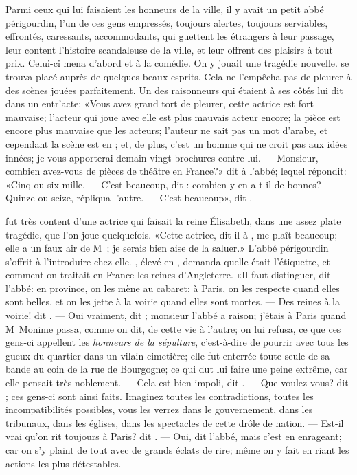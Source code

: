 Parmi ceux qui lui faisaient les honneurs de la ville, il y avait un
petit abbé périgourdin, l’un de ces gens empressés, toujours alertes,
toujours serviables, effrontés, caressants, accommodants, qui guettent
les étrangers à leur passage, leur content l’histoire scandaleuse de la
ville, et leur offrent des plaisirs à tout prix. Celui-ci mena d’abord
 et  à la comédie. On y jouait une tragédie nouvelle.
 se trouva placé auprès de quelques beaux esprits. Cela ne
l’empêcha pas de pleurer à des scènes jouées parfaitement. Un des
raisonneurs qui étaient à ses côtés lui dit dans un entr’acte: «Vous
avez grand tort de pleurer, cette actrice est fort mauvaise; l’acteur
qui joue avec elle est plus mauvais acteur encore; la pièce est encore
plus mauvaise que les acteurs; l’auteur ne sait pas un mot d’arabe, et
cependant la scène est en ; et, de plus, c’est un homme qui ne
croit pas aux idées innées; je vous apporterai demain vingt 
brochures 
contre lui. — Monsieur, combien avez-vous de pièces de théâtre en
France?» dit  à l’abbé; lequel répondit: «Cinq ou six mille. — C’est
beaucoup, dit : combien y en a-t-il de bonnes? —Quinze ou seize,
répliqua l’autre. — C’est beaucoup», dit .



 fut très content d’une actrice qui faisait la reine Élisabeth,
dans une assez plate tragédie, que l’on joue quelquefois. «Cette
actrice, dit-il à , me plaît beaucoup; elle a un faux air de
M~; je serais bien aise de la saluer.» L’abbé
périgourdin s’offrit à l’introduire chez elle. , élevé en
, demanda quelle était l’étiquette, et comment on traitait en
France les reines d’Angleterre. «Il faut distinguer, dit l’abbé: en
province, on les mène au cabaret; à Paris, on les respecte quand elles
sont belles, et on les jette à la voirie quand elles sont mortes. — Des
reines à la voirie! dit . — Oui vraiment, dit ; monsieur
l’abbé a raison; j’étais à Paris quand M~Monime passa,
comme on dit, de cette vie à l’autre; on lui refusa, ce que ces gens-ci
appellent les \emph{honneurs de la sépulture}, c’est-à-dire de pourrir avec
tous les gueux du quartier dans un vilain cimetière; elle fut enterrée
toute seule de sa bande au coin de la rue de Bourgogne; ce qui dut lui
faire une peine extrême, car elle pensait très noblement. — Cela est bien
impoli, dit . — Que voulez-vous? dit ; ces gens-ci sont
ainsi faits. Imaginez toutes les contradictions, toutes les
incompatibilités possibles, vous les verrez dans le gouvernement, dans
les tribunaux, dans les églises, dans les spectacles de cette drôle de
nation. — Est-il vrai qu’on rit toujours à Paris? dit . — Oui, dit
l’abbé, mais c’est en enrageant; car on s’y plaint de tout avec de
grands éclats de rire; même on y fait en riant les actions les plus
\linebreak détestables.



